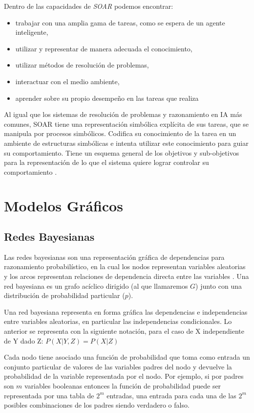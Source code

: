 Dentro de las capacidades de \emph{SOAR} podemos encontrar:

\begin{itemize}
  \item trabajar con una amplia gama de tareas, como se espera de un agente inteligente,
  \item utilizar y representar de manera adecuada el conocimiento,
  \item utilizar m\'{e}todos de resoluci\'{o}n de problemas,
  \item interactuar con el medio ambiente,
  \item aprender sobre su propio desempe\~no en las tareas que realiza 
\end{itemize}


Al igual que los sistemas de resolución de problemas y razonamiento en IA m\'{a}s comunes, SOAR tiene una representaci\'{o}n simb\'{o}lica expl\'{i}cita de sus tareas, que se manipula por procesos simb\'{o}licos. Codifica su conocimiento de la tarea en un ambiente de estructuras simb\'{o}licas e intenta utilizar este conocimiento para guiar su comportamiento. Tiene un esquema general de los objetivos y sub-objetivos para la representaci\'{o}n de lo que el sistema quiere lograr controlar su comportamiento \cite{laird1987soar}.

\section{Modelos Gr\'{a}ficos}
\subsection{Redes Bayesianas}

Las redes bayesianas son una representaci\'{o}n gr\'{a}fica de dependencias para razonamiento probabil\'{i}stico, en la cual los nodos representan variables aleatorias y los arcos representan relaciones de dependencia directa entre las variables \cite{torres1998bayesian}. Una red bayesiana es un grafo ac\'{i}clico dirigido (al que llamaremos $G$) junto con una distribución de probabilidad particular ($p$).

Una red bayesiana representa en forma gr\'{a}fica las dependencias e independencias entre variables aleatorias, en particular las independencias condicionales. Lo anterior se representa con la siguiente notaci\'{o}n, para el caso de X independiente de Y dado Z: $P(X|Y,Z)=P(X|Z)$

Cada nodo tiene asociado una función de probabilidad que toma como entrada un conjunto particular de valores de las variables padres del nodo y devuelve la probabilidad de la variable representada por el nodo. Por ejemplo, si por padres son $m$ variables booleanas entonces la función de probabilidad puede ser representada por una tabla de $2^m$ entradas, una entrada para cada una de las $2^m$ posibles combinaciones de los padres siendo verdadero o falso.

